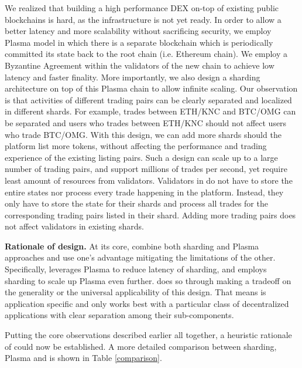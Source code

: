We realized that building a high performance DEX on-top of existing public blockchains is hard, as the infrastructure is not yet ready. In order to allow a better latency and more scalability without sacrificing security, we employ Plasma model in which there is a separate blockchain which is periodically committed its state back to the root chain (i.e. Ethereum chain). We employ a Byzantine Agreement within the validators of the new chain to achieve low latency and faster finality. More importantly, we also design a sharding architecture on top of this Plasma chain to allow infinite scaling. Our observation is that activities of different trading pairs can be clearly separated and localized in different shards. For example, trades between ETH/KNC and BTC/OMG can be separated and users who trades between ETH/KNC should not affect users who trade BTC/OMG. With this design, we can add more shards should the platform list more tokens, without affecting the performance and trading experience of the existing listing pairs. Such a design can scale up to a large number of trading pairs, and support millions of trades per second, yet require least amount of resources from validators. Validators in \codename do not have to store the entire states nor process every trade happening in the platform. Instead, they only have to store the state for their shards and process all trades for the corresponding trading pairs listed in their shard. Adding more trading pairs does not affect validators in existing shards.

\textbf{Rationale of \codename design.} At its core, \codename combine both sharding and Plasma approaches and use one's advantage mitigating the limitations of the other. Specifically, \codename leverages Plasma to reduce latency of sharding, and employs sharding to scale up Plasma even further. \codename does so through making a tradeoff on the generality or the universal applicability of this design. That means \codename is application specific and only works best with a particular class of decentralized applications with clear separation among their sub-components.


Putting the core observations described earlier all together, a heuristic rationale of \codename could now be established. A more detailed comparison between sharding, Plasma and \codename is shown in Table \ref{comparison}.


